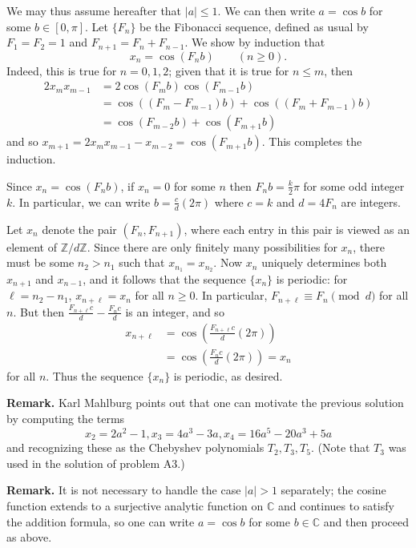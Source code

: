 \documentclass[amssymb,twocolumn,pra,10pt,aps]{revtex4-1}
\begin{document}
\begin{itemize}
We may thus assume hereafter that $|a|\leq 1$. We can then write $a = \cos b$ for some $b \in [0,\pi]$. 
Let $\{F_n\}$ be the Fibonacci sequence, defined as usual by $F_1=F_2=1$ and $F_{n+1}=F_n+F_{n-1}$. We show by induction that
\[
x_n = \cos(F_n b) \qquad (n \geq 0).
\]
Indeed, this is true for $n=0,1,2$; given that it is true for $n \leq m$, then
\begin{align*}
2x_mx_{m-1}&=2\cos(F_mb)\cos(F_{m-1}b) \\
&= \cos((F_m-F_{m-1})b)+\cos((F_m+F_{m-1})b) \\
&= \cos(F_{m-2}b)+\cos(F_{m+1}b)
\end{align*}
and so 
$x_{m+1} = 2x_mx_{m-1}-x_{m-2} = \cos(F_{m+1}b)$. This completes the induction.


Since $x_n = \cos(F_n b)$, if $x_n=0$ for some $n$ then $F_n b = \frac{k}{2} \pi$ for some odd integer $k$. In particular, we can write $b = \frac{c}{d}(2\pi)$ where $c = k$ and $d = 4F_n$ are integers.


Let $x_n$ denote the pair $(F_n,F_{n+1})$, where each entry in this pair is viewed as an element of $\mathbb{Z}/d\mathbb{Z}$. Since there are only finitely many possibilities for $x_n$, there must be some $n_2>n_1$ such that $x_{n_1}=x_{n_2}$. Now $x_n$ uniquely determines both $x_{n+1}$ and $x_{n-1}$, and it follows that the sequence $\{x_n\}$ is periodic: for $\ell = n_2-n_1$, $x_{n+\ell} = x_n$ for all $n \geq 0$. In particular, $F_{n+\ell} \equiv F_n \pmod{d}$ for all $n$. But then $\frac{F_{n+\ell}c}{d}-\frac{F_n c}{d}$ is an integer, and so
\begin{align*}
x_{n+\ell} &= \cos\left(\frac{F_{n+\ell}c}{d}(2\pi)\right)\\
& = \cos\left(\frac{F_n c}{d}(2\pi)\right) = x_n
\end{align*}
for all $n$. Thus the sequence $\{x_n\}$ is periodic, as desired.

\noindent
\textbf{Remark.}
Karl Mahlburg points out that one can motivate the previous solution by computing the terms
\[
x_2 = 2a^2 - 1, x_3 = 4a^3 - 3a, x_4 = 16a^5 - 20a^3 + 5a
\]
and recognizing these as the Chebyshev polynomials $T_2, T_3, T_5$. (Note that $T_3$ was used in the solution of
problem A3.)

\noindent
\textbf{Remark.}
It is not necessary to handle the case $\left| a \right| > 1$ separately; the cosine function extends
to a surjective analytic function on $\mathbb{C}$ and continues to satisfy the addition formula,
so one can write $a = \cos b$ for some $b \in \mathbb{C}$
and then proceed as above.



\end{itemize}
\end{document}
